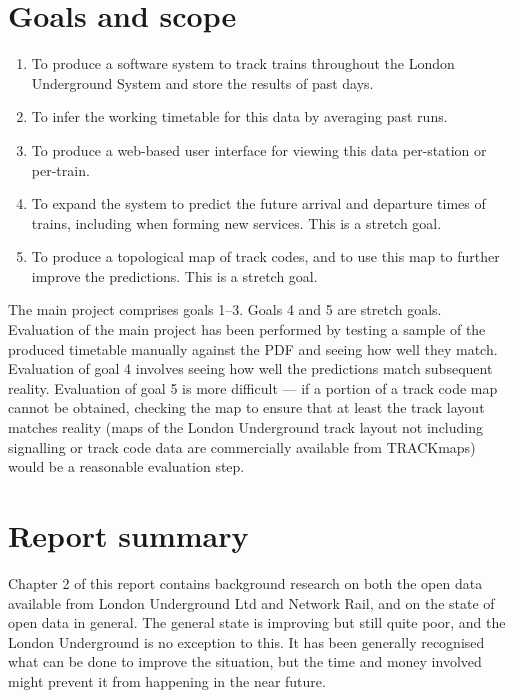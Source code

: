 \documentclass[a4paper,12pt,twoside]{report}
\begin{document}
\section{Goals and scope}

\begin{enumerate}
  \item To produce a software system to track trains throughout the London
    Underground System and store the results of past days.
  \item To infer the working timetable for this data by averaging past runs.
  \item To produce a web-based user interface for viewing this data per-station
    or per-train.
  \item To expand the system to predict the future arrival and departure times
    of trains, including when forming new services. This is a stretch goal.
  \item To produce a topological map of track codes, and to use this map to
    further improve the predictions. This is a stretch goal.
\end{enumerate}

The main project comprises goals 1--3. Goals 4 and 5 are stretch goals.
Evaluation of the main project has been performed by testing a sample of the
produced timetable manually against the PDF and seeing how well they match.
Evaluation of goal 4 involves seeing how well the predictions match subsequent
reality. Evaluation of goal 5 is more difficult --- if a portion of a track
code map cannot be obtained, checking the map to ensure that at least the track
layout matches reality (maps of the London Underground track layout not
including signalling or track code data are commercially available from
TRACKmaps\cite{TRACKmaps5}) would be a reasonable evaluation step.

\section{Report summary}

Chapter 2 of this report contains background research on both the open data
available from London Underground Ltd and Network Rail, and on the state of
open data in general. The general state is improving but still quite poor, and
the London Underground is no exception to this. It has been generally
recognised what can be done to improve the situation, but the time and money
involved might prevent it from happening in the near future.
\end{document}
